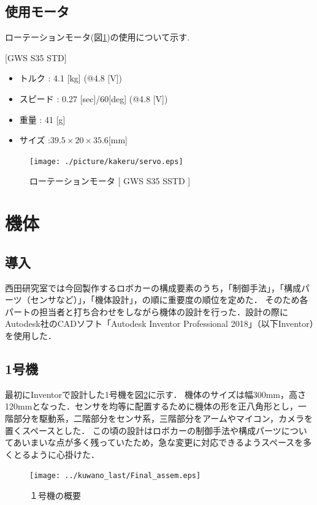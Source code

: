 \documentclass[11pt,a4]{jsarticle}
\begin{document}
\subsection{使用モータ}
ローテーションモータ(図\ref{servo})の使用について示す.

[GWS S35 STD]
\begin{itemize}
 \item トルク        : 4.1 [kg] (@4.8 [V])
 \item スピード      : 0.27 [sec]/60[deg] (@4.8 [V])
 \item 重量          : 41 [g]
 \item サイズ        :$39.5 \times 20 \times 35.6$[mm]
\end{itemize}

\begin{figure}[h]
  \centering
    \texttt{[image: ./picture/kakeru/servo.eps]}
    \caption{ローテーションモータ [ GWS S35 SSTD ]}
  \label{servo}
\end{figure}

\newpage

\section{機体}

\subsection{導入}
西田研究室では今回製作するロボカーの構成要素のうち，「制御手法」，「構成パーツ（センサなど）」，「機体設計」，の順に重要度の順位を定めた．
そのため各パートの担当者と打ち合わせをしながら機体の設計を行った．設計の際にAutodesk社のCADソフト「Autodesk Inventor Professional 2018」（以下Inventor）を使用した．

\subsection{1号機}
最初にInventorで設計した1号機を図\ref{assem}に示す．
機体のサイズは幅300mm，高さ120mmとなった．センサを均等に配置するために機体の形を正八角形とし，一階部分を駆動系，二階部分をセンサ系，三階部分をアームやマイコン，カメラを置くスペースとした．
この頃の設計はロボカーの制御手法や構成パーツについてあいまいな点が多く残っていたため，急な変更に対応できるようスペースを多くとるように心掛けた．

\begin{figure}[h]
\begin{center}
  \texttt{[image: ../kuwano\_last/Final\_assem.eps]}
\end{center}
\caption{１号機の概要}
\label{assem}
\end{figure}
\end{document}
